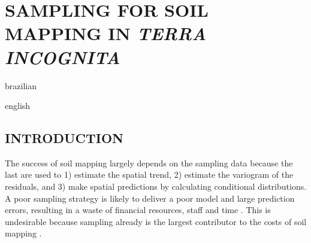 \artigotrue
\chapter{SAMPLING FOR SOIL MAPPING IN \emph{TERRA INCOGNITA}}
\label{chap:chap08}

\def\ptkeys{}

\begin{chapterabstract}{brazilian}{\ptkeys}

\end{chapterabstract}

\def\enkeys{}
  
\begin{chapterabstract}{english}{\enkeys}

\end{chapterabstract}

\formatchapter

\section{INTRODUCTION}


The success of soil mapping largely depends on the sampling data because the last are used to 1) estimate the 
spatial trend, 2) estimate the variogram of the residuals, and 3) make spatial predictions by calculating 
conditional distributions. A poor sampling strategy is likely to deliver a poor model and large prediction 
errors, resulting in a waste of financial resources, staff and time \cite{vanGroenigenEtAl1999,  
deGruijterEtAl2006, LanEtAl2010}. This is undesirable because sampling already is the largest contributor to 
the costs of soil mapping \cite{WebsterEtAl1990, vanGroenigenEtAl1999, KempenEtAl2012}.

